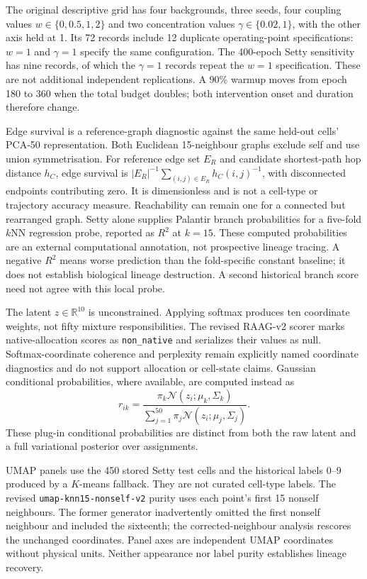 \documentclass[11pt]{article}
\begin{document}
The original descriptive grid has four backgrounds, three seeds, four
coupling values $w\in\{0,0.5,1,2\}$ and two concentration values
$\gamma\in\{0.02,1\}$, with the other axis held at 1. Its 72 records include
12 duplicate operating-point specifications: $w=1$ and $\gamma=1$ specify the
same configuration. The 400-epoch Setty sensitivity has nine records, of
which the $\gamma=1$ records repeat the $w=1$ specification. These are not
additional independent replications. A 90\% warmup moves from epoch 180 to
360 when the total budget doubles; both intervention onset and duration
therefore change.

Edge survival is a reference-graph diagnostic against the same held-out
cells' PCA-50 representation. Both Euclidean 15-neighbour graphs exclude self and use union symmetrisation. For reference edge set $E_R$ and candidate shortest-path hop distance $h_C$, edge survival is $|E_R|^{-1}\sum_{(i,j)\in E_R}h_C(i,j)^{-1}$, with disconnected endpoints contributing zero. It is dimensionless and is not a cell-type or trajectory accuracy
measure. Reachability can remain one for a connected but rearranged graph.
Setty alone supplies Palantir branch probabilities for a five-fold $k$NN
regression probe, reported as $R^2$ at $k=15$\cite{setty2019palantir}.
These computed probabilities are an external computational annotation,
not prospective lineage tracing. A negative $R^2$ means worse prediction
than the fold-specific constant baseline; it does not establish biological
lineage destruction. A second historical branch score need not agree with
this local probe.

The latent $z\in\mathbb R^{10}$ is unconstrained. Applying softmax produces
ten coordinate weights, not fifty mixture responsibilities. The revised
RAAG-v2 scorer marks native-allocation scores as \texttt{non\_native} and
serializes their values as null. Softmax-coordinate coherence and perplexity
remain explicitly named coordinate diagnostics and do not support allocation
or cell-state claims. Gaussian conditional probabilities, where available,
are computed instead as
\begin{equation}
 r_{ik}=\frac{\pi_k\mathcal N(z_i;\mu_k,\Sigma_k)}
 {\sum_{j=1}^{50}\pi_j\mathcal N(z_i;\mu_j,\Sigma_j)}.
\label{eq:responsibility}
\end{equation}
These plug-in conditional probabilities are distinct from both the raw latent
and a full variational posterior over assignments.

UMAP panels use the 450 stored Setty test cells and the historical labels
0--9 produced by a $K$-means fallback. They are not curated cell-type labels.
The revised \texttt{umap-knn15-nonself-v2} purity uses each point's first 15
nonself neighbours. The former generator inadvertently omitted the first
nonself neighbour and included the sixteenth; the corrected-neighbour analysis rescores the unchanged
coordinates. Panel axes are independent UMAP coordinates without physical
units\cite{mcinnes2018umap}. Neither appearance nor label purity establishes
lineage recovery.
\end{document}
